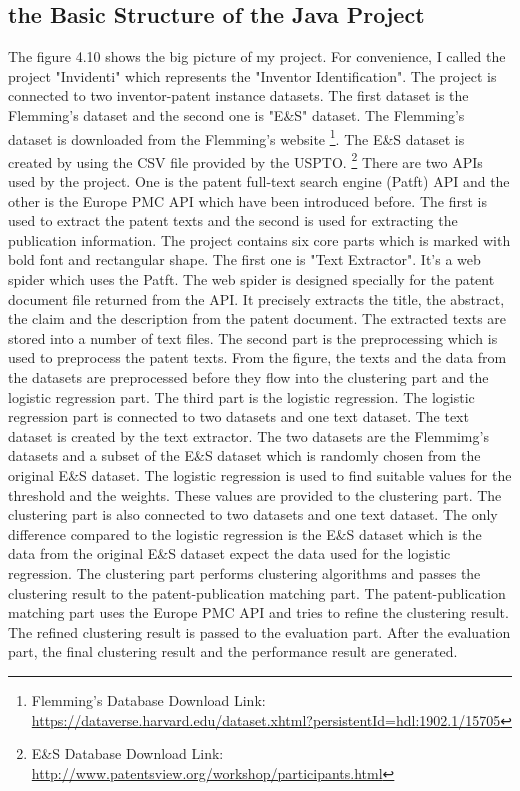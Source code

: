 \subsection{the Basic Structure of the Java Project}
The figure 4.10 shows the big picture of my project. For convenience, I called the project "Invidenti" which represents the "Inventor Identification". The project is connected to two inventor-patent instance datasets. The first dataset is the Flemming's dataset and the second one is "E\&S" dataset. The Flemming's dataset is downloaded from the Flemming's website \footnote{Flemming's Database Download Link: \url{https://dataverse.harvard.edu/dataset.xhtml?persistentId=hdl:1902.1/15705}}. The E\&S dataset is created by using the CSV file provided by the USPTO. \footnote{E\&S Database Download Link: \url {http://www.patentsview.org/workshop/participants.html} } There are two APIs used by the project. One is the patent full-text search engine (Patft) API and the other is the Europe PMC API which have been introduced before. The first is used to extract the patent texts and the second is used for extracting the publication information. The project contains six core parts which is marked with bold font and rectangular shape. The first one is "Text Extractor". It's a web spider which uses the Patft. The web spider is designed specially for the patent document file returned from the API. It precisely extracts the title, the abstract, the claim and the description from the patent document. The extracted texts are stored into a number of text files. The second part is the preprocessing which is used to preprocess the patent texts.  From the figure, the texts and the data from the datasets are preprocessed before they flow into the clustering part and the logistic regression part. The third part is the logistic regression. The logistic regression part  is connected to two datasets and one text dataset. The text dataset is created by the text extractor. The two datasets are the Flemmimg's datasets and a subset of the E\&S dataset which is randomly chosen from the original E\&S dataset. The logistic regression is used to find suitable values for the threshold and the weights. These values are provided to the clustering part. The clustering part is also connected to two datasets and one text dataset. The only difference compared to the logistic regression is the E\&S dataset which is the data from the original E\&S dataset expect the data used for the logistic regression. The clustering part performs clustering algorithms and passes the clustering result to the patent-publication matching part. The patent-publication matching part uses the Europe PMC API and tries to refine the clustering result. The refined clustering result is passed to the evaluation part. After the evaluation part, the final clustering result and the performance result are generated.   

